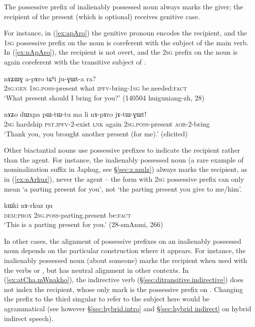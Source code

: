 The possessive prefix of inalienably possessed noun  always marks the giver; the recipient of the present (which is optional) receives genitive case. 

For instance, in (\ref{ex:apAro}) the genitive pronoun  encodes the recipient, and the \textsc{1sg} possessive prefix on the noun is coreferent with the subject of the main verb. In (\ref{ex:nApAro}), the recipient is not overt, and the \textsc{2sg} prefix on the noun is again coreferent with the transitive subject of .

\begin{exe}
\ex \label{ex:apAro}
\gll nɤʑɯɣ a-pɤro tɕʰi ju-ɣɯt-a ra? \\
\textsc{2sg}:\textsc{gen} \textsc{1sg}.\textsc{poss}-present what \textsc{ipfv}-bring-\textsc{1sg} be.needed:\textsc{fact} \\
\glt `What present should I bring for you?' (140504 huiguniang-zh, 28)
\end{exe}

\begin{exe}
\ex \label{ex:nApAro}
\gll nɤʑo dɯxpa pɯ-tɯ-tu ma li nɤ-pɤro jɤ-tɯ-ɣɯt! \\
\textsc{2sg} hardship \textsc{pst}.\textsc{ipfv}-2-exist \textsc{lnk} again \textsc{2sg}.\textsc{poss}-present \textsc{aor}-2-bring \\
\glt `Thank you, you brought another present (for me).' (elicited)
\end{exe}

Other biactantial nouns use possessive prefixes to indicate the recipient rather than the agent. For instance, the inalienably possessed noun  (a rare example of  nominalization suffix in Japhug, see §\ref{sec:z.nmlz}) always marks the recipient, as in (\ref{ex:nArkuz}), never the agent -- the form  with \textsc{2sg} possessive prefix can only mean `a parting present for you', not `the parting present you give to me/him'.

\begin{exe}
\ex \label{ex:nArkuz}
\gll  kɯki nɤ-rkuz ŋu \\
\textsc{dem}:\textsc{prox} \textsc{2sg}.\textsc{poss}-parting.present be:\textsc{fact} \\
\glt `This is a parting present for you.' (28-smAnmi, 266)
\end{exe}

In other cases, the alignment of possessive prefixes on an inalienably possessed noun depends on the  particular construction where it appears. For instance, the inalienably possessed noun  (about someone) marks the recipient when used with the verbs  or , but has neutral alignment in other contexts. In (\ref{ex:atCha.mWnakho}), the indirective verb  (§\ref{sec:ditransitive.indirective}) does not index the recipient, whose only mark is the possessive prefix on . Changing the prefix to the third singular  to refer to the subject here would be agrammatical (see however §\ref{sec:hybrid.intro} and §\ref{sec:hybrid indirect} on hybrid indirect speech).


